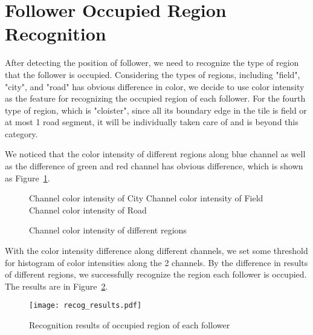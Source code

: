 \section{Follower Occupied Region Recognition}
After detecting the position of follower, we need to recognize the type of region that the follower is occupied. Considering the types of 
regions, including "field", "city", and "road" has obvious difference in color, we decide to use color intensity as the feature for 
recognizing the occupied region of each follower. For the fourth type of region, which is "cloister", since all its boundary edge in the tile 
is field or at most 1 road segment, it will be individually taken care of and is beyond this category.

We noticed that the color intensity of different regions along blue channel as well as the difference of green and red channel has obvious 
difference, which is shown as Figure~\ref{Channel_diff}.

    \begin{figure}[htbp]
        \centering

        \caption{Channel color intensity of different regions}
         Channel color intensity of City
         Channel color intensity of Field
		 Channel color intensity of Road
        \label{Channel_diff}
     \end{figure}

With the color intensity difference along different channels, we set some threshold for histogram of color intensities along the 
2 channels. By the difference in results of different regions, we successfully recognize the region each follower is occupied. The 
results are in Figure~\ref{recog_results}.

	\begin{figure}[htbp]
		  \centering
		  \texttt{[image: recog\_results.pdf]}
		  \caption{Recognition results of occupied region of each follower}
		  \label{recog_results}
	\end{figure}

 
